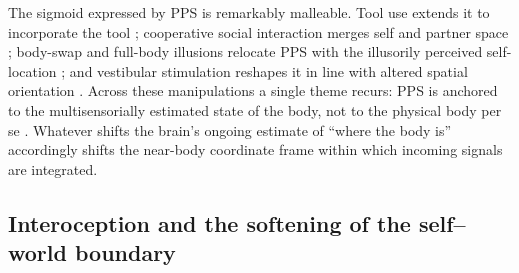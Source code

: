 The sigmoid expressed by PPS is remarkably malleable. Tool use extends it to incorporate the tool \citep{iriki1996coding, maravita2004tools}; cooperative social interaction merges self and partner space \citep{teneggi2013social}; body-swap and full-body illusions relocate PPS with the illusorily perceived self-location \citep{noel2015peripersonal, noel2015fullbody}; and vestibular stimulation reshapes it in line with altered spatial orientation \citep{pfeiffer2018vestibular}. Across these manipulations a single theme recurs: PPS is anchored to the multisensorially estimated state of the body, not to the physical body per se \citep{blanke2015behavioral, Grivaz2017, serino2015bodypart}. Whatever shifts the brain's ongoing estimate of ``where the body is'' accordingly shifts the near-body coordinate frame within which incoming signals are integrated.

\subsection{Interoception and the softening of the self--world boundary}


